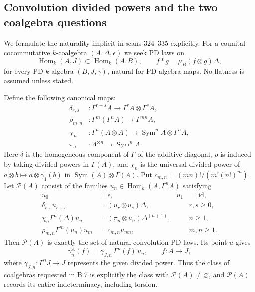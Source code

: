 \subsection{Convolution divided powers and the two coalgebra questions}

We formulate the naturality implicit in scans 324--335 explicitly.
For a counital cocommutative $k$-coalgebra $(A,\Delta,\epsilon)$ we
seek PD laws on
\[
 \operatorname{Hom}_k(A,J)\subset\operatorname{Hom}_k(A,B),
 \qquad f*g=\mu_B(f\otimes g)\Delta,
\]
for every PD $k$-algebra $(B,J,\gamma)$, natural for PD algebra maps.
No flatness is assumed unless stated.

\begin{theorem}
\label{sa08:D007}
Define the following canonical maps:
\begin{align*}
 \delta_{r,s}&:\Gamma^{r+s}A\longrightarrow
                  \Gamma^rA\otimes\Gamma^sA,\\
 \rho_{m,n}&:\Gamma^m(\Gamma^nA)\longrightarrow\Gamma^{mn}A,\\
 \chi_n&:\Gamma^n(A\otimes A)\longrightarrow
                    \operatorname{Sym}^nA\otimes\Gamma^nA,\\
 \pi_n&:A^{\otimes n}\longrightarrow\operatorname{Sym}^nA.
\end{align*}
Here $\delta$ is the homogeneous component of $\Gamma$ of the
additive diagonal, $\rho$ is induced by taking divided powers in
$\Gamma(A)$, and $\chi_n$ is the universal divided power of
$a\otimes b\mapsto a\otimes\gamma_1(b)$ in
$\operatorname{Sym}(A)\otimes\Gamma(A)$. Put
$c_{m,n}=(mn)!/(m!(n!)^m)$. Let $\mathcal P(A)$ consist of the families
$u_n\in\operatorname{Hom}_k(A,\Gamma^nA)$ satisfying
\begin{align}
 u_0&=\epsilon,&u_1&=\mathrm{id},\tag{U}\label{eq:D-U}\\
 \delta_{r,s}u_{r+s}&=(u_r\otimes u_s)\Delta,
       &&r,s\geq0,\tag{A}\label{eq:D-A}\\
 \chi_n\Gamma^n(\Delta)u_n
   &=(\pi_n\otimes u_n)\Delta^{(n+1)},
       &&n\geq1,\tag{S}\label{eq:D-S}\\
 \rho_{m,n}\Gamma^m(u_n)u_m&=c_{m,n}u_{mn},
       &&m,n\geq1.\tag{I}\label{eq:D-I}
\end{align}
Then $\mathcal P(A)$ is exactly the set of natural convolution PD
laws. Its point $u$ gives
\[
 \gamma_n^A(f)=\gamma_{J,n}\,\Gamma^n(f)\,u_n,
 \qquad f:A\to J,
\]
where $\gamma_{J,n}:\Gamma^nJ\to J$ represents the given divided
power. Thus the class of coalgebras requested in B.7 is explicitly
the class with $\mathcal P(A)\ne\varnothing$, and $\mathcal P(A)$
records its entire indeterminacy, including torsion.
\end{theorem}
